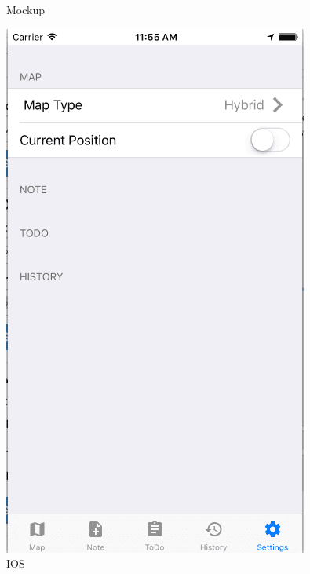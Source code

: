\documentclass[12pt]{article}
\begin{document}
\begin{figure}[ht]
	\caption{Mockup}
	\endminipage\hfill
	\centering
	\includegraphics[width=\linewidth, height=0.4\textheight, keepaspectratio=true, frame]{screenshots/SettingsIos.png}
	\caption{IOS}
	\endminipage\hfill
	\centering

\end{figure}
\end{document}
